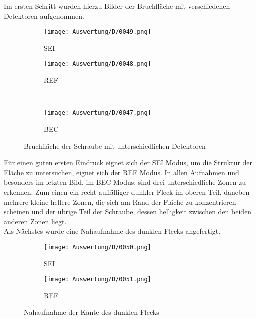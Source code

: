 Im ersten Schritt wurden hierzu Bilder der Bruchfläche mit verschiedenen Detektoren aufgenommen.
\begin{figure}[h]
    \centering
    
    \begin{subfigure}[b]{0.45\textwidth}
        \centering
        \texttt{[image: Auswertung/D/0049.png]}
        \caption{SEI}
    \end{subfigure}
    \hfill
    \begin{subfigure}[b]{0.45\textwidth}
        \centering
        \texttt{[image: Auswertung/D/0048.png]}
        \caption{REF}
    \end{subfigure}
    \\
    \begin{subfigure}[b]{0.45\textwidth}
        \centering
        \texttt{[image: Auswertung/D/0047.png]}
        \caption{BEC}
    \end{subfigure}
    \caption{Bruchfläche der Schraube mit unterschiedlichen Detektoren}
\end{figure}

Für einen guten ersten Eindruck eignet sich der SEI Modus, um die Struktur der Fläche zu untersuchen, eignet sich der REF Modus. In allen Aufnahmen und besonders im letzten Bild, im BEC Modus, sind drei unterschiedliche Zonen zu erkennen. Zum einen ein recht auffälliger dunkler Fleck im oberen Teil, daneben mehrere kleine hellere Zonen, die sich am Rand der Fläche zu konzentrieren scheinen und der übrige Teil der Schraube, dessen helligkeit zwischen den beiden anderen Zonen liegt. \\

\newpage
Als Nächstes wurde eine Nahaufnahme des dunklen Flecks angefertigt.
\begin{figure}[h]
    \centering
    
    \begin{subfigure}[b]{0.45\textwidth}
        \centering
        \texttt{[image: Auswertung/D/0050.png]}
        \caption{SEI}
    \end{subfigure}
    \hfill
    \begin{subfigure}[b]{0.45\textwidth}
        \centering
        \texttt{[image: Auswertung/D/0051.png]}
        \caption{REF}
    \end{subfigure}
    \caption{Nahaufnahme der Kante des dunklen Flecks}
\end{figure}

